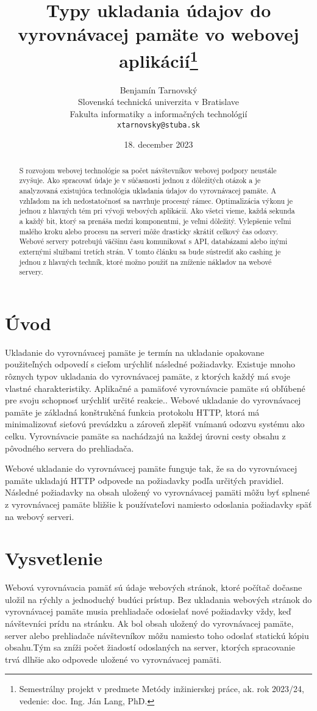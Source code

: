 \documentclass[10pt,oneside,slovak,a4paper]{article}
\title{Typy ukladania údajov do vyrovnávacej pamäte vo webovej aplikácií\thanks{Semestrálny projekt v predmete Metódy inžinierskej práce, ak. rok 2023/24, vedenie: doc. Ing. Ján Lang, PhD.}}
\author{Benjamín Tarnovský\\[2pt]
	{\small Slovenská technická univerzita v Bratislave}\\
	{\small Fakulta informatiky a informačných technológií}\\
	{\small \texttt{xtarnovsky@stuba.sk}}
	}
\date{\small 18. december 2023}
\begin{document}
\maketitle

\begin{abstract}

S rozvojom webovej technológie sa počet návštevníkov webovej podpory neustále zvyšuje.
Ako spracovať  údaje je v súčasnosti jednou z dôležitých otázok a je analyzovaná existujúca technológia ukladania údajov do vyrovnávacej pamäte.
A vzhľadom na ich nedostatočnosť sa navrhuje procesný rámec. Optimalizácia výkonu je jednou z hlavných tém pri vývoji webových aplikácií.
Ako všetci vieme, každá sekunda a každý bit, ktorý sa prenáša medzi komponentmi, je veľmi dôležitý.
Vylepšenie veľmi malého kroku alebo procesu na serveri môže drasticky skrátiť celkový čas odozvy.
Webové servery potrebujú väčšinu času komunikovať s API, databázami alebo inými externými službami tretích strán.
V tomto článku sa bude sústrediť ako cashing je jednou z hlavných techník, ktoré možno použiť na zníženie nákladov na webové servery.

\end{abstract}

\section{Úvod} 
\quad Ukladanie do vyrovnávacej pamäte je termín na ukladanie opakovane použiteľných odpovedí s cieľom urýchliť následné požiadavky. Existuje mnoho rôznych typov ukladania do vyrovnávacej pamäte, z ktorých každý má svoje vlastné charakteristiky. Aplikačné a pamäťové vyrovnávacie pamäte sú obľúbené pre svoju schopnosť urýchliť určité reakcie.. Webové ukladanie do vyrovnávacej pamäte je základná konštrukčná funkcia protokolu HTTP, ktorá má minimalizovať sieťovú prevádzku a zároveň zlepšiť vnímanú odozvu systému ako celku. Vyrovnávacie pamäte sa nachádzajú na každej úrovni cesty obsahu z pôvodného servera do prehliadača.

Webové ukladanie do vyrovnávacej pamäte funguje tak, že sa do vyrovnávacej pamäte ukladajú HTTP odpovede na požiadavky podľa určitých pravidiel. Následné požiadavky na obsah uložený vo vyrovnávacej pamäti môžu byť splnené z vyrovnávacej pamäte bližšie k používateľovi namiesto odoslania požiadavky späť na webový serveri. 

\section{Vysvetlenie} \label{Vysvetlenie}
\quad Webová vyrovnávacia pamäť sú údaje webových stránok, ktoré počítač dočasne uložil na rýchly a jednoduchý budúci prístup. Bez ukladania webových stránok do vyrovnávacej pamäte musia prehliadače odosielať nové požiadavky vždy, keď návštevníci prídu na  stránku. Ak bol  obsah uložený do vyrovnávacej pamäte,  server alebo prehliadače návštevníkov môžu namiesto toho odoslať statickú kópiu  obsahu.Tým sa zníži počet žiadostí odoslaných na  server, ktorých spracovanie trvá dlhšie ako odpovede uložené vo vyrovnávacej pamäti. 
\end{document}
